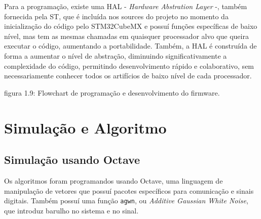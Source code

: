 \documentclass[11pt,a4paper]{report}
\begin{document}
	Para a programação, existe uma HAL - {\it Hardware Abstration Layer} -, também fornecida pela ST, que é incluída nos sources do projeto no momento da inicialização do código pelo STM32CubeMX e possuí funções específicas de baixo nível, mas tem as mesmas chamadas em quaisquer processador alvo que queira executar o código, aumentando a portabilidade. Também, a HAL é construída de forma a aumentar o nível de abstração, diminuindo significativamente a complexidade do código, permitindo desenvolvimento rápido e colaborativo, sem necessariamente conhecer todos os artifícios de baixo nível de cada processador.
	\begin{center}
		\vspace{0.1cm}
	\footnotesize{figura 1.9: Flowchart de programação e desenvolvimento do firmware.}
	\end{center}

\chapter{Simulação e Algoritmo}
	\section{Simulação usando Octave}
	
	Os algoritmos foram programandos usando Octave, uma linguagem de manipulação de vetores que possuí pacotes específicos para comunicação e sinais digitais. Também possuí uma função \texttt{agwn}, ou {\it Additive Gaussian White Noise}, que introduz barulho no sistema e no sinal.\\
	
\end{document}
